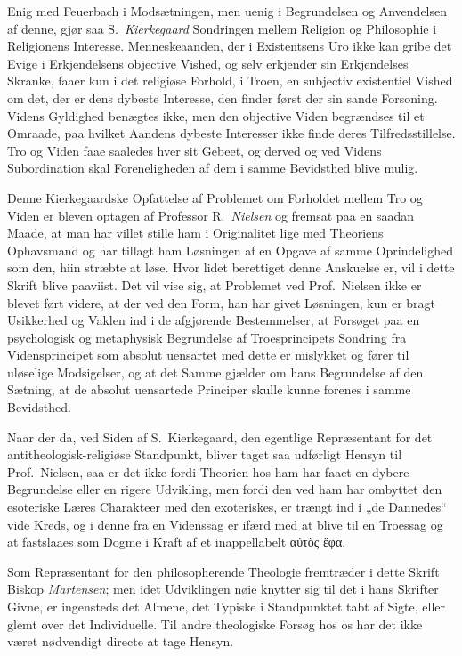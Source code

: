 \documentclass[12pt,a4paper]{book}
\newcommand{\opage}[1]{\marginnote{\footnotesize\textit{[#1]}}}
\begin{document}
Enig med Feuerbach i Modsætningen, men uenig i Begrundelsen og
Anvendelsen af denne, gjør saa S.\ \emph{Kierkegaard} Sondringen mellem
Religion og Philosophie i Religionens Interesse. Menneskeaanden, der i
Existentsens Uro ikke kan gribe det Evige i Erkjendelsens objective
Vished, og selv erkjender sin Erkjendelses Skranke, faaer kun i det
religiøse Forhold, i Troen, en subjectiv existentiel Vished om det,
der er dens dybeste Interesse, den finder først der sin sande
Forsoning. Videns Gyldighed benægtes ikke, men den objective Viden
begrændses til et Omraade, paa hvilket Aandens dybeste Interesser ikke
finde deres Tilfredsstillelse. Tro og Viden faae saaledes hver sit
Gebeet, og derved og ved Videns Subordination skal Foreneligheden af
dem i samme Bevidsthed blive mulig.

Denne Kierkegaardske Opfattelse af Problemet om Forholdet mellem Tro
og Viden er bleven optagen af Professor R.\ \emph{Nielsen} og fremsat paa en
saadan Maade, at man har villet stille ham i Originalitet lige med
Theoriens Ophavsmand og har tillagt ham Løsningen af en Opgave \opage{4}af
samme Oprindelighed som den, hiin stræbte at løse. Hvor lidet
berettiget denne Anskuelse er, vil i dette Skrift blive paaviist. Det
vil vise sig, at Problemet ved Prof.\ Nielsen ikke er blevet ført
videre, at der ved den Form, han har givet Løsningen, kun er bragt
Usikkerhed og Vaklen ind i de afgjørende Bestemmelser, at Forsøget paa
en psychologisk og metaphysisk Begrundelse af Troesprincipets Sondring
fra Vidensprincipet som absolut uensartet med dette er mislykket og
fører til uløselige Modsigelser, og at det Samme gjælder om hans
Begrundelse af den Sætning, at de absolut uensartede Principer skulle
kunne forenes i samme Bevidsthed.

Naar der da, ved Siden af S.\ Kierkegaard, den egentlige Repræsentant
for det antitheologisk-religiøse Standpunkt, bliver taget saa udførligt
Hensyn til Prof.\ Nielsen, saa er det ikke fordi Theorien hos ham har
faaet en dybere Begrundelse eller en rigere Udvikling, men fordi den
ved ham har ombyttet den esoteriske Læres Charakteer med den exoteriskes,
er trængt ind i „de Dannedes“ vide Kreds, og i denne fra en
Videnssag er ifærd med at blive til en Troessag og at fastslaaes som
Dogme i Kraft af et inappellabelt
αὐτὸς ἔφα.

Som Repræsentant for den philosopherende Theologie fremtræder i dette
Skrift Biskop \emph{Martensen}; men idet Udviklingen nøie knytter sig til det
i hans Skrifter Givne, er ingensteds det Almene, det Typiske i
Standpunktet tabt af Sigte, eller glemt over det Individuelle. Til andre
theologiske Forsøg hos os har det ikke været nødvendigt directe at
tage Hensyn.
\end{document}
